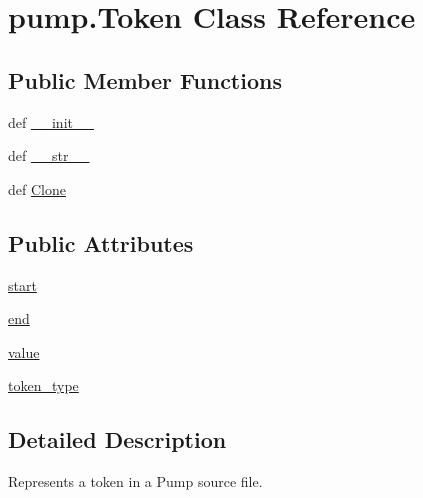 \hypertarget{classpump_1_1_token}{\section{pump.\-Token Class Reference}
\label{classpump_1_1_token}
}
\subsection*{Public Member Functions}
\begin{DoxyCompactItemize}
\item 
def \hyperlink{classpump_1_1_token_a3b3ced23ee340e022ef7213dc271930c}{\-\_\-\-\_\-init\-\_\-\-\_\-}
\item 
def \hyperlink{classpump_1_1_token_a43c540a621b588e726c57b05636c7981}{\-\_\-\-\_\-str\-\_\-\-\_\-}
\item 
def \hyperlink{classpump_1_1_token_ab7e33f3365a848e7a68bbf75a78ca45b}{Clone}
\end{DoxyCompactItemize}
\subsection*{Public Attributes}
\begin{DoxyCompactItemize}
\item 
\hyperlink{classpump_1_1_token_a53e3333a770bc8773224a5af78bca5bb}{start}
\item 
\hyperlink{classpump_1_1_token_abb88c0ece4274cfd974fd01d0468953c}{end}
\item 
\hyperlink{classpump_1_1_token_a5b7ab395a380b775b2bf0a8b0abfda86}{value}
\item 
\hyperlink{classpump_1_1_token_aeac105b76f6af13c8c64ba0a94e37d90}{token\-\_\-type}
\end{DoxyCompactItemize}


\subsection{Detailed Description}
\begin{DoxyVerb}Represents a token in a Pump source file.\end{DoxyVerb}
 

